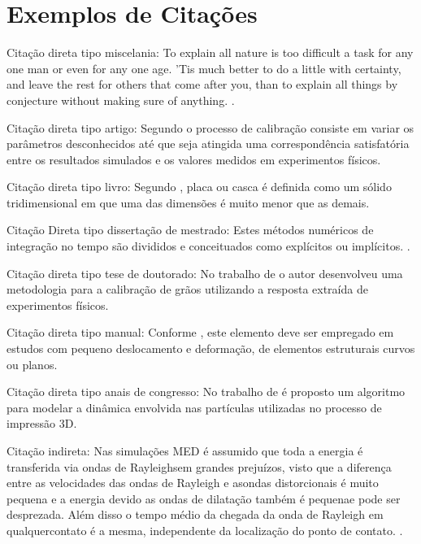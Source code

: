 		
		
	\section{\esp Exemplos de Citações}\label{section:2.1}
	
		Citação direta tipo miscelania:
			To explain all nature is too difficult a task for any one man or even for any one age. 'Tis much better to do a little with certainty, and leave the rest for others that come after you, than to explain all things by conjecture without making sure of anything. .
			
		Citação direta tipo artigo:
			Segundo  o processo de calibração consiste em variar os parâmetros desconhecidos até que seja atingida uma correspondência satisfatória entre os resultados simulados e os valores medidos em experimentos físicos.
			
		Citação direta tipo livro:
			Segundo , placa ou casca é definida como um sólido tridimensional em que uma das dimensões é muito menor que as demais.
			
		Citação Direta tipo dissertação de mestrado:
			Estes métodos numéricos de integração no tempo são divididos e conceituados como explícitos ou implícitos.  \cite{Mendes_2012}.
			
		Citação direta tipo tese de doutorado:
			No trabalho de  o autor desenvolveu uma metodologia para a calibração  de grãos utilizando a resposta extraída de experimentos físicos.
			
		Citação direta tipo manual:
			Conforme , este elemento deve ser empregado em estudos com pequeno deslocamento e deformação, de elementos estruturais curvos ou planos.
			
		Citação direta tipo anais de congresso:
			No trabalho de  é proposto um algoritmo para modelar a dinâmica envolvida nas partículas utilizadas no processo de impressão 3D.
			
		Citação indireta:
			Nas simulações MED é assumido que toda a energia é transferida via ondas de Rayleighsem grandes prejuízos, visto que a diferença entre as velocidades das ondas de Rayleigh e asondas distorcionais é muito pequena e a energia devido as ondas de dilatação também é pequenae pode ser desprezada. Além disso o tempo médio da chegada da onda de Rayleigh em qualquercontato é a mesma, independente da localização do ponto de contato. \cite{Rackl_2017}.
			

